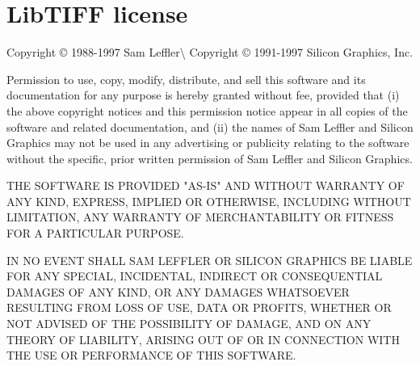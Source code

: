 \chapter{Lib\+TIFF license }
\hypertarget{md__c_1_2_users_2altay_2_one_drive_2_projects_2etrek_2_third_party_libraries_2vtk_2share_2licens59d26323553109266e803b2a68d15743}{}\label{md__c_1_2_users_2altay_2_one_drive_2_projects_2etrek_2_third_party_libraries_2vtk_2share_2licens59d26323553109266e803b2a68d15743}
\label{md__c_1_2_users_2altay_2_one_drive_2_projects_2etrek_2_third_party_libraries_2vtk_2share_2licens59d26323553109266e803b2a68d15743_autotoc_md1034}%
%


Copyright © 1988-\/1997 Sam Leffler\textbackslash{} Copyright © 1991-\/1997 Silicon Graphics, Inc.

Permission to use, copy, modify, distribute, and sell this software and its documentation for any purpose is hereby granted without fee, provided that (i) the above copyright notices and this permission notice appear in all copies of the software and related documentation, and (ii) the names of Sam Leffler and Silicon Graphics may not be used in any advertising or publicity relating to the software without the specific, prior written permission of Sam Leffler and Silicon Graphics.

THE SOFTWARE IS PROVIDED "{}\+AS-\/\+IS"{} AND WITHOUT WARRANTY OF ANY KIND, EXPRESS, IMPLIED OR OTHERWISE, INCLUDING WITHOUT LIMITATION, ANY WARRANTY OF MERCHANTABILITY OR FITNESS FOR A PARTICULAR PURPOSE. ~\newline


IN NO EVENT SHALL SAM LEFFLER OR SILICON GRAPHICS BE LIABLE FOR ANY SPECIAL, INCIDENTAL, INDIRECT OR CONSEQUENTIAL DAMAGES OF ANY KIND, OR ANY DAMAGES WHATSOEVER RESULTING FROM LOSS OF USE, DATA OR PROFITS, WHETHER OR NOT ADVISED OF THE POSSIBILITY OF DAMAGE, AND ON ANY THEORY OF LIABILITY, ARISING OUT OF OR IN CONNECTION WITH THE USE OR PERFORMANCE OF THIS SOFTWARE. 